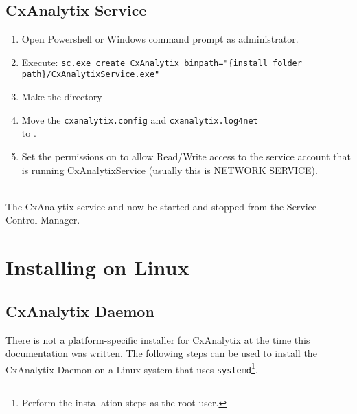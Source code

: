 \subsection{CxAnalytix Service}
\begin{enumerate}
    \item Open Powershell or Windows command prompt as administrator.
    \item Execute: \texttt{sc.exe create CxAnalytix binpath="\{install folder path\}/CxAnalytixService.exe"}
    \item Make the directory \texttt{\windowsconfigpathbase}
    \item Move the \texttt{cxanalytix.config} and \texttt{cxanalytix.log4net} \\to \windowsconfigpathbase.
    \item Set the permissions on \texttt{\windowsconfigpathbase} to allow Read/Write access to the service account that is running
    CxAnalytixService (usually this is NETWORK SERVICE).
\end{enumerate}



\noindent\\The CxAnalytix service and now be started and stopped from the Service Control Manager.


\section{Installing on Linux}

\subsection{CxAnalytix Daemon}
There is not a platform-specific installer for CxAnalytix at the time this documentation was written. The following steps can 
be used to install the CxAnalytix Daemon on a Linux system that uses \verb|systemd|\footnote{Perform the installation steps as the root user.}.


